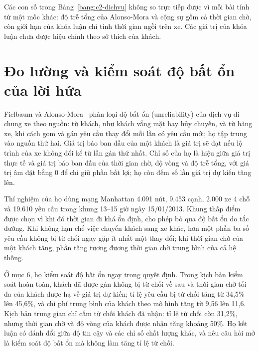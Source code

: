 Các con số trong Bảng~\ref{bang:c2-dichvu} không so trực tiếp được vì mỗi bài tính từ một mốc khác: độ trễ tổng của
Alonso-Mora và cộng sự gồm cả thời gian chờ, còn giới hạn của khóa luận chỉ tính thời gian ngồi trên xe. Các giá trị
của khóa luận chưa được hiệu chỉnh theo sở thích của khách.

\section{Đo lường và kiểm soát độ bất ổn của lời hứa}
\label{muc:c2-dolech}

Fielbaum và Alonso-Mora~\cite{fielbaum2020} phân loại độ bất ổn (unreliability) của dịch vụ đi chung xe theo nguồn:
từ khách, như khách vắng mặt hay hủy chuyến, và từ hãng xe, khi cách gom và gán yêu cầu thay đổi mỗi lần có yêu cầu
mới; họ tập trung vào nguồn thứ hai. Giá trị báo ban đầu của một khách là giá trị sẽ đạt nếu lộ trình của xe không đổi
kể từ lần gán thứ nhất. Chỉ số của họ là hiệu giữa giá trị thực tế và giá trị báo ban đầu của thời gian chờ, độ vòng
và độ trễ tổng, với giá trị âm đặt bằng 0 để chỉ giữ phần bất lợi; họ còn đếm số lần giá trị dự kiến tăng lên.

Thí nghiệm của họ dùng mạng Manhattan 4.091 nút, 9.453 cạnh, 2.000 xe 4 chỗ và 19.610 yêu cầu trong khung 13--15 giờ
ngày 15/01/2013. Khung thấp điểm được chọn vì khi đó thời gian đi khá ổn định, cho phép bỏ qua độ bất ổn do tắc
đường. Khi không hạn chế việc chuyển khách sang xe khác, hơn một phần ba số yêu cầu không bị từ chối ngay gặp ít nhất
một thay đổi; khi thời gian chờ của một khách tăng, phần tăng tương đương thời gian chờ trung bình của cả hệ thống.

Ở mục 6, họ kiểm soát độ bất ổn ngay trong quyết định. Trong kịch bản kiểm soát hoàn toàn, khách đã được gán không bị
từ chối về sau và thời gian chờ tối đa của khách được hạ về giá trị dự kiến; tỉ lệ yêu cầu bị từ chối tăng từ 34,5\%
lên 45,6\%, và chi phí trung bình của khách theo mô hình tăng từ 9,56 lên 11,6. Kịch bản trung gian chỉ cấm từ chối
khách đã nhận: tỉ lệ từ chối còn 31,2\%, nhưng thời gian chờ và độ vòng của khách được nhận tăng khoảng 50\%. Họ kết
luận có đánh đổi giữa độ tin cậy và các chỉ số chất lượng khác, và nêu câu hỏi mở là kiểm soát độ bất ổn mà không làm
tăng tỉ lệ từ chối.

